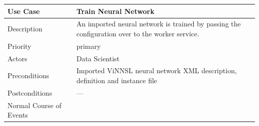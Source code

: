 \begin{longtable}[]{@{}ll@{}}
\toprule
\begin{minipage}[b]{0.27\columnwidth}\raggedright\strut
\textbf{Use Case}\strut
\end{minipage} & \begin{minipage}[b]{0.68\columnwidth}\raggedright\strut
\textbf{Train Neural Network}\strut
\end{minipage}\tabularnewline
\midrule
\endhead
\begin{minipage}[t]{0.27\columnwidth}\raggedright\strut
Description\strut
\end{minipage} & \begin{minipage}[t]{0.68\columnwidth}\raggedright\strut
An imported neural network is trained by passing the configuration over
to the worker service.\strut
\end{minipage}\tabularnewline
\begin{minipage}[t]{0.27\columnwidth}\raggedright\strut
Priority\strut
\end{minipage} & \begin{minipage}[t]{0.68\columnwidth}\raggedright\strut
primary\strut
\end{minipage}\tabularnewline
\begin{minipage}[t]{0.27\columnwidth}\raggedright\strut
Actors\strut
\end{minipage} & \begin{minipage}[t]{0.68\columnwidth}\raggedright\strut
Data Scientist\strut
\end{minipage}\tabularnewline
\begin{minipage}[t]{0.27\columnwidth}\raggedright\strut
Preconditions\strut
\end{minipage} & \begin{minipage}[t]{0.68\columnwidth}\raggedright\strut
Imported ViNNSL neural network XML description, definition and instance
file\strut
\end{minipage}\tabularnewline
\begin{minipage}[t]{0.27\columnwidth}\raggedright\strut
Postconditions\strut
\end{minipage} & \begin{minipage}[t]{0.68\columnwidth}\raggedright\strut
---\strut
\end{minipage}\tabularnewline
\begin{minipage}[t]{0.27\columnwidth}\raggedright\strut
Normal Course of Events\strut
\end{minipage} & \begin{minipage}[t]{0.68\columnwidth}\raggedright\strut

\end{minipage}
\end{longtable}
